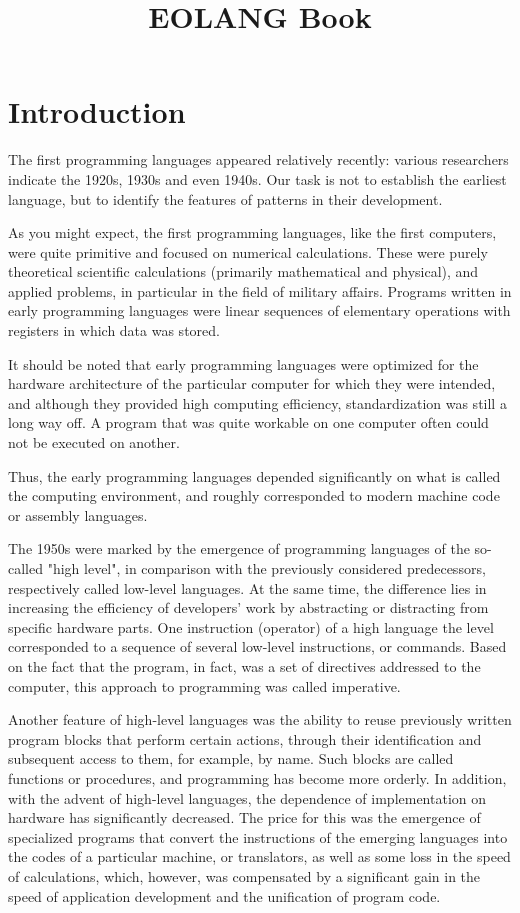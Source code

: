 \documentclass[12pt]{book}
\title{EOLANG Book}
\begin{document}
\raggedbottom
\tableofcontents

\chapter{Introduction}
The first programming languages appeared relatively recently: various researchers indicate the 1920s, 1930s and even 1940s. Our task is not to establish the earliest language, but to identify the features of patterns in their development.

As you might expect, the first programming languages, like the first computers, were quite primitive and focused on numerical calculations. These were purely theoretical scientific calculations (primarily mathematical and physical), and applied problems, in particular in the field of military affairs. Programs written in early programming languages were linear sequences of elementary operations with registers in which data was stored.

It should be noted that early programming languages were optimized for the hardware architecture of the particular computer for which they were intended, and  although they provided high computing efficiency, standardization was still a long way off. A program that was quite workable on one computer often could not be executed on another.

Thus, the early programming languages depended significantly on what is called the computing environment, and roughly corresponded to modern machine code or assembly languages.

The 1950s were marked by the emergence of programming languages of the so-called "high level", in comparison with the previously considered predecessors, respectively called low-level languages. At the same time, the difference lies in increasing the efficiency of developers' work by abstracting or distracting from specific hardware parts. One instruction (operator) of a high language the level corresponded to a sequence of several low-level instructions, or commands. Based on the fact that the program, in fact, was a set of directives addressed to the computer, this approach to programming was called imperative.

Another feature of high-level languages was the ability to reuse previously written program blocks that perform certain actions, through their identification and subsequent access to them, for example, by name. Such blocks are called functions or procedures, and programming has become more orderly. In addition, with the advent of high-level languages, the dependence of implementation on hardware has significantly decreased. The price for this was the emergence of specialized programs that convert the instructions of the emerging languages into the codes of a particular machine, or translators, as well as some loss in the speed of calculations, which, however, was compensated by a significant gain in the speed of application development and the unification of program code.
\end{document}
